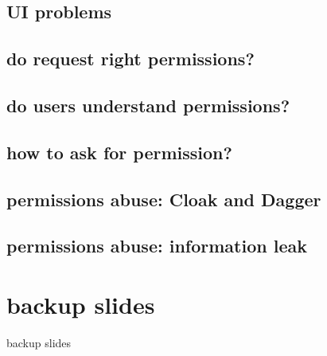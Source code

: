 \subsection{UI problems}


\subsection{do request right permissions?}


\subsection{do users understand permissions?}


\subsection{how to ask for permission?}


\subsection{permissions abuse: Cloak and Dagger}


\subsection{permissions abuse: information leak}






\section{backup slides}
\begin{frame}{backup slides}
\end{frame}
